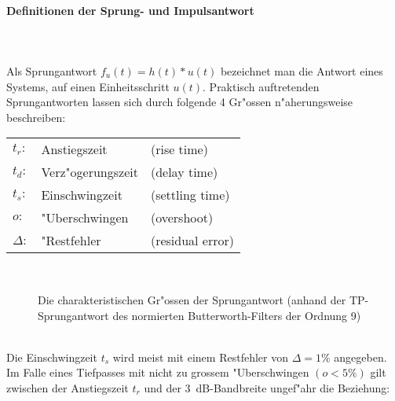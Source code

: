 \paragraph{Definitionen der Sprung- und Impulsantwort}~\\
\\
\nit Als Sprungantwort $f_{u}(t)=h(t)\ast u(t)$ bezeichnet man die
Antwort eines Systems, auf einen Einheitsschritt $u(t)$.  Praktisch
auftretenden Sprungantworten lassen sich durch fol\-gen\-de 4
Gr"os\-sen n"a\-he\-rungs\-wei\-se beschreiben:\\
\begin{tabular}{lll}
\hspace*{9mm}$t_{r}:$ \hspace*{1cm}& Anstiegszeit\index{Anstiegszeit}& (rise time)\index{rise time}\\
\hspace*{9mm}$t_{d}:$             & Verz"ogerungszeit\index{Verzogerungszeit@{Verz\"ogerungszeit}} & (delay time)\index{delay time}\\
\hspace*{9mm}$t_{s}:$     & Einschwingzeit\index{Einschwingzeit} & (settling time)\\
\hspace*{9mm}$o:$                 & "Uberschwingen\index{Uberschwingen@{\"Uberschwingen}} & (overshoot)\index{overshoot}\\
\hspace*{9mm}$\Delta:$            & "Restfehler & (residual error)\index{residual error} \\
\end{tabular}\\
\begin{figure}[!htb]
\vspace*{-3mm}%
\begin{center}
  \caption{Die charakteristischen Gr"ossen der Sprungantwort (anhand der TP-Sprungantwort des normierten Butterworth-Filters der Ordnung 9)}
\end{center}
\vspace*{-6mm}
\end{figure}~\\
\nit Die Einschwingzeit $t_s$ wird meist mit einem Restfehler von $\Delta=1\%$ angegeben. Im
Falle eines Tiefpasses mit nicht zu grossem "Uberschwingen $(o<5\%)$
gilt zwischen der Anstiegszeit $t_r$ und der
3~dB-Bandbreite ungef"ahr die Beziehung:
